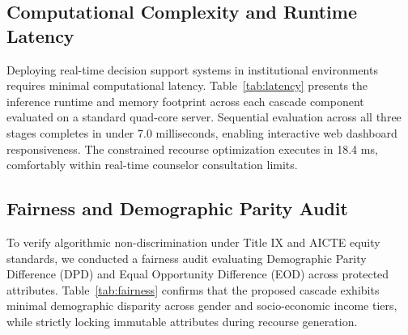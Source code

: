 \documentclass[conference]{IEEEtran}
\begin{document}
\subsection{Computational Complexity and Runtime Latency}
Deploying real-time decision support systems in institutional environments requires minimal computational latency. Table~\ref{tab:latency} presents the inference runtime and memory footprint across each cascade component evaluated on a standard quad-core server. Sequential evaluation across all three stages completes in under 7.0 milliseconds, enabling interactive web dashboard responsiveness. The constrained recourse optimization executes in 18.4 ms, comfortably within real-time counselor consultation limits.

\begin{table}[htbp]
\caption{Computational Runtime Latency and Memory Footprint Breakdown across Cascade Stages}
\label{tab:latency}
\centering
{}
\end{table}

\subsection{Fairness and Demographic Parity Audit}
To verify algorithmic non-discrimination under Title IX and AICTE equity standards, we conducted a fairness audit evaluating Demographic Parity Difference (DPD) and Equal Opportunity Difference (EOD) across protected attributes. Table~\ref{tab:fairness} confirms that the proposed cascade exhibits minimal demographic disparity across gender and socio-economic income tiers, while strictly locking immutable attributes during recourse generation.
\end{document}
